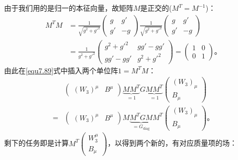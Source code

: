 由于我们用的是归一的本征向量，故矩阵$M$是正交的($M^T = M^{-1}$)：
\begin{equation}
\label{equ7.92}
\begin{aligned}
M^TM & = \frac{1}{\sqrt{g^2+g'^2}} \begin{pmatrix}
g & g'\\ g'&-g
\end{pmatrix} \frac{1}{\sqrt{g^2+g'^2}} \begin{pmatrix}
g & g'\\ g'&-g
\end{pmatrix} \\
& = \frac{1}{g^2+g'^2} \begin{pmatrix}
g^2+g'^2 & gg'-gg'\\ gg'-gg'&g^2+g'^2
\end{pmatrix} = \begin{pmatrix}
1 & 0\\ 0 & 1
\end{pmatrix}\text{。}
\end{aligned}
\end{equation}
由此在\eqref{equ7.89}式中插入两个单位阵$1 = M^TM$：
\begin{equation}
\label{equ7.93}
\begin{aligned}
&\begin{pmatrix}
(W_3)^\mu & B^\mu
\end{pmatrix} \underbrace{MM^T}_{=1} G \underbrace{MM^T}_{=1} \begin{pmatrix}
(W_3)_\mu \\ B_\mu
\end{pmatrix} \\ =& \begin{pmatrix}
(W_3)^\mu & B^\mu
\end{pmatrix} M\underbrace{M^TGM}_{=G_\text{diag}}M^T \begin{pmatrix}
(W_3)_\mu \\ B_\mu
\end{pmatrix} \text{。}
\end{aligned}
\end{equation}
剩下的任务即是计算$M^T \begin{pmatrix}
W_3^\mu \\ B_\mu
\end{pmatrix}$，以得到两个新的，有对应质量项的场：
